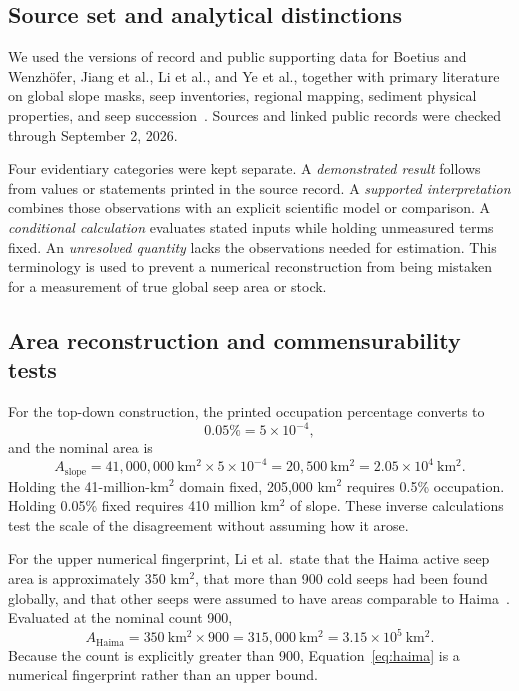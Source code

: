 \documentclass[11pt,letterpaper]{article}
\begin{document}
\subsection{Source set and analytical distinctions}

We used the versions of record and public supporting data for Boetius and Wenzh\"ofer, Jiang et al., Li et al., and Ye et al., together with primary literature on global slope masks, seep inventories, regional mapping, sediment physical properties, and seep succession~\cite{boetius2013,jiang2025,li2024,ye2026}. Sources and linked public records were checked through September 2, 2026.

Four evidentiary categories were kept separate. A \emph{demonstrated result} follows from values or statements printed in the source record. A \emph{supported interpretation} combines those observations with an explicit scientific model or comparison. A \emph{conditional calculation} evaluates stated inputs while holding unmeasured terms fixed. An \emph{unresolved quantity} lacks the observations needed for estimation. This terminology is used to prevent a numerical reconstruction from being mistaken for a measurement of true global seep area or stock.

\subsection{Area reconstruction and commensurability tests}

For the top-down construction, the printed occupation percentage converts to
\begin{equation}
0.05\% = 5\times10^{-4},
\end{equation}
and the nominal area is
\begin{equation}
A_{\mathrm{slope}}=
41{,}000{,}000\ \mathrm{km^2}\times5\times10^{-4}
=20{,}500\ \mathrm{km^2}
=2.05\times10^4\ \mathrm{km^2}.
\label{eq:slope}
\end{equation}
Holding the 41-million-km$^2$ domain fixed, 205,000 km$^2$ requires 0.5\% occupation. Holding 0.05\% fixed requires 410 million km$^2$ of slope. These inverse calculations test the scale of the disagreement without assuming how it arose.

For the upper numerical fingerprint, Li et al.\ state that the Haima active seep area is approximately 350 km$^2$, that more than 900 cold seeps had been found globally, and that other seeps were assumed to have areas comparable to Haima~\cite{li2024}. Evaluated at the nominal count 900,
\begin{equation}
A_{\mathrm{Haima}}=
350\ \mathrm{km^2}\times900
=315{,}000\ \mathrm{km^2}
=3.15\times10^5\ \mathrm{km^2}.
\label{eq:haima}
\end{equation}
Because the count is explicitly greater than 900, Equation~\eqref{eq:haima} is a numerical fingerprint rather than an upper bound.
\end{document}

